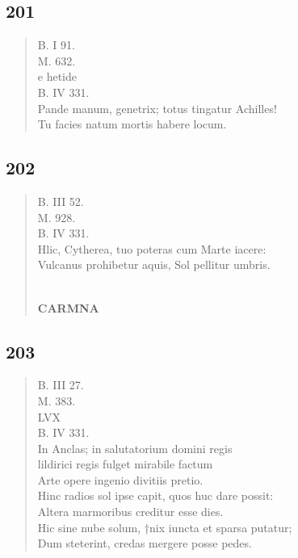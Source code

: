 \documentclass[11pt, a4paper]{report}
\begin{document}
\begin{verse}
      \end{verse}
  
            \subsection*{201}
      \begin{verse}
      B. I 91. \\ M. 632. \\ e hetide \\ B. IV 331. \\ Pande manum, genetrix; totus tingatur Achilles! \\ Tu facies natum mortis habere locum. \\ 
      \end{verse}
  
            \subsection*{202}
      \begin{verse}
      B. III 52. \\ M. 928. \\ B. IV 331. \\ Hlic, Cytherea, tuo poteras cum Marte iacere: \\ Vulcanus prohibetur aquis, Sol pellitur umbris. \\ 
        ﻿\pagebreak 
     \marginpar{[176]} \begin{center} \textbf{CARMNA} \end{center}
      \end{verse}
  
            \subsection*{203}
      \begin{verse}
      B. III 27. \\ M. 383. \\ LVX \\ B. IV 331. \\ In Anclas; in salutatorium domini regis \\ lildirici regis fulget mirabile factum \\ Arte opere ingenio divitiis pretio. \\ Hinc radios sol ipse capit, quos huc dare possit: \\ Altera marmoribus creditur esse dies. \\ Hic sine nube solum, †nix iuncta et sparsa putatur; \\ Dum steterint, credas mergere posse pedes. \\ 
      \end{verse}
  
\end{document}
